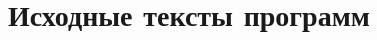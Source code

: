 \documentclass[utf8x,14pt, coursreport]{G7-32}
\begin{document}

\appendix

\chapter{Исходные тексты программ}

\small{}

\end{document}
